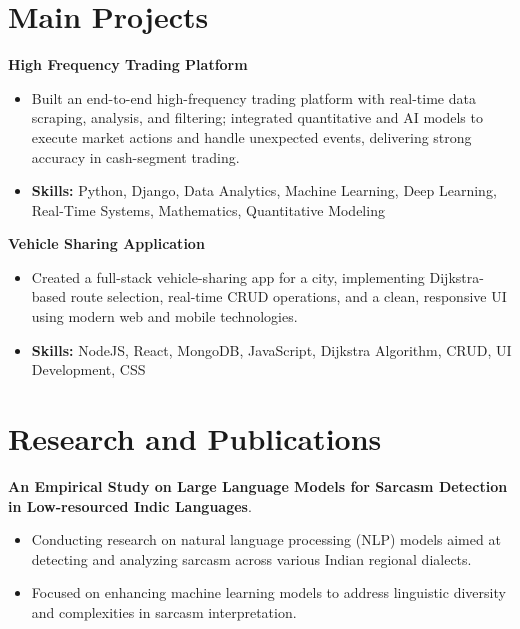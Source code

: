 \documentclass[a4paper,11pt]{article}
\begin{document}
\section{\textbf{Main Projects}}

\vspace{1mm}
  \textbf{High Frequency Trading Platform  }
\vspace{-1.5mm} %
\begin{itemize}
  \item Built an end-to-end high-frequency trading platform with real-time data scraping, analysis, and filtering; integrated quantitative and AI models to execute market actions and handle unexpected events, delivering strong accuracy in cash-segment trading.
\vspace{-3mm}
  \item \textbf{Skills:} Python, Django, Data Analytics, Machine Learning, Deep Learning, Real-Time Systems, Mathematics, Quantitative Modeling
\end{itemize}


\vspace{1mm}
   \textbf{Vehicle Sharing Application }
\vspace{-1.5mm} %
\begin{itemize}
  \item Created a full-stack vehicle-sharing app for a city, implementing Dijkstra-based route selection, real-time CRUD operations, and a clean, responsive UI using modern web and mobile technologies.
\vspace{-3mm}
  \item \textbf{Skills:} NodeJS, React, MongoDB, JavaScript, Dijkstra Algorithm, CRUD, UI Development, CSS
\end{itemize}



\section{\textbf{Research and Publications} \hfill }
\vspace{1mm}
  \textbf{An Empirical Study on Large Language Models for Sarcasm Detection in Low-resourced Indic Languages}.
\vspace{-1mm} %
\begin{itemize}
  \item Conducting research on natural language processing (NLP) models aimed at detecting and analyzing sarcasm across various Indian regional dialects.
\vspace{-3mm}
  \item Focused on enhancing machine learning models to address linguistic diversity and complexities in sarcasm interpretation.
\end{itemize}
\end{document}
